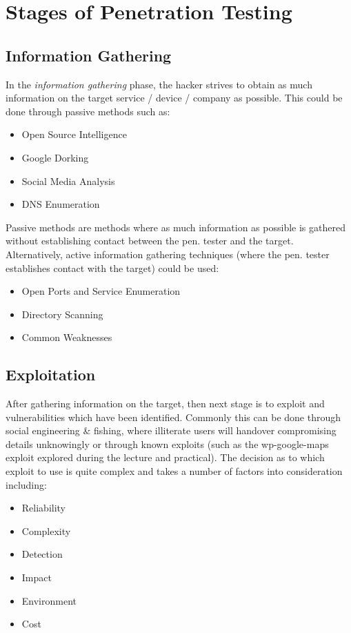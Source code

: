 \section{Stages of Penetration Testing}
\subsection{Information Gathering}
In the \textit{information gathering} phase, the hacker strives to obtain as much information on the target service / device / company as possible. This could be done through passive methods such as:
\begin{itemize}
    \item Open Source Intelligence
    \item Google Dorking
    \item Social Media Analysis
    \item DNS Enumeration
\end{itemize}
Passive methods are methods where as much information as possible is gathered without establishing contact between the pen. tester and the target.\\

Alternatively, active information gathering techniques (where the pen. tester establishes contact with the target) could be used:
\begin{itemize}
    \item Open Ports and Service Enumeration
    \item Directory Scanning
    \item Common Weaknesses
\end{itemize}

\subsection{Exploitation}
After gathering information on the target, then next stage is to exploit and vulnerabilities which have been identified. Commonly this can be done through social engineering \& fishing, where illiterate users will handover compromising details unknowingly or through known exploits (such as the wp-google-maps exploit explored during the lecture and practical). The decision as to which exploit to use is quite complex and takes a number of factors into consideration including:
\begin{itemize}
    \item Reliability
    \item Complexity
    \item Detection
    \item Impact
    \item Environment
    \item Cost
\end{itemize}

